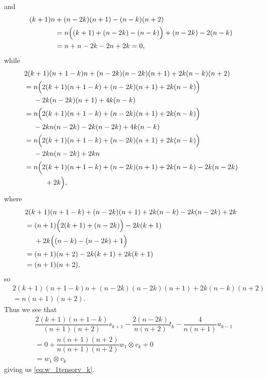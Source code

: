 and
\begin{align*}
  (k+1)n&+(n-2k)(n+1)-(n-k)(n+2) \\
        &= n\Bigl( (k+1)+(n-2k) - (n-k) \Bigr) + (n-2k) - 2(n-k)\\
  &= n + n-2k -2n+2k = 0,
\end{align*}
while
\begin{align*}
  &2(k+1)(n+1-k)n + (n-2k)(n-2k)(n+1)+2k(n-k)(n+2) \\
  &= n\Bigl( 2(k+1)(n+1-k) + (n-2k)(n+1) + 2k(n-k) \Bigr) \\*
  &\phantom{{}={}}{} - 2k(n-2k)(n+1) + 4k(n-k) \\
  &= n\Bigl( 2(k+1)(n+1-k) + (n-2k)(n+1) + 2k(n-k) \Bigr) \\*
  &\phantom{{}={}}{} - 2kn(n-2k) - 2k(n-2k) + 4k(n-k) \\
  &= n\Bigl( 2(k+1)(n+1-k) + (n-2k)(n+1) + 2k(n-k) \Bigr) \\*
  &\phantom{{}={}}{} - 2kn(n-2k) + 2kn \\
  &= n\Bigl( 2(k+1)(n+1-k) + (n-2k)(n+1) + 2k(n-k) - 2k(n-2k) \\*
  &\phantom{{}={}n\Bigl()}{} + 2k \Bigr),
\end{align*}
where
\begin{align*}
  &2(k+1)(n+1-k) + (n-2k)(n+1) + 2k(n-k) - 2k(n-2k) + 2k \\
  &= (n+1)\Bigl( 2(k+1) + (n-2k) \Bigr) - 2k(k+1) \\*
  &\phantom{{}={}}{} + 2k\Bigl( (n-k) - (n-2k) + 1\Bigr) \\
  &= (n+1)(n+2) - 2k(k+1) + 2k(k+1) \\
  &= (n+1)(n+2),
\end{align*}
so
\begin{align*}
  &2(k+1)(n+1-k)n + (n-2k)(n-2k)(n+1)+2k(n-k)(n+2) \\
  &= n(n+1)(n+2).
\end{align*} 
Thus we see that
\begin{align*}
  &\dfrac{2(k+1)(n+1-k)}{(n+1)(n+2)}s_{k+1} - \dfrac{2(n-2k)}{n(n+2)}t_k - \dfrac{4}{n(n+1)}u_{k-1}\\
  &= 0 + \dfrac{n(n+1)(n+2)}{n(n+1)(n+2)}w_1\otimes v_k + 0 \\
  &= w_1\otimes v_k
\end{align*}
giving us \cref{eq:w_1tensorv_k}. 

